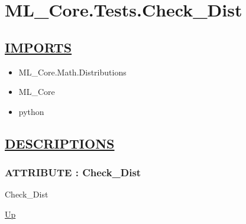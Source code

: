 \chapter*{ML\_Core.Tests.Check\_Dist}
\hypertarget{ecldoc:toc:ML_Core.Tests.Check_Dist}{}

\section*{\underline{IMPORTS}}
\begin{itemize}
\item ML\_Core.Math.Distributions
\item ML\_Core
\item python
\end{itemize}

\section*{\underline{DESCRIPTIONS}}
\subsection*{ATTRIBUTE : Check\_Dist}
\hypertarget{ecldoc:ml_core.tests.check_dist}{}
\begin{minipage}[t]{\textwidth}
\begin{flushleft}
 Check\_Dist 
\end{flushleft}
\end{minipage}
\hyperlink{ecldoc:toc:ML_Core/Tests}{Up}

\par
\par
